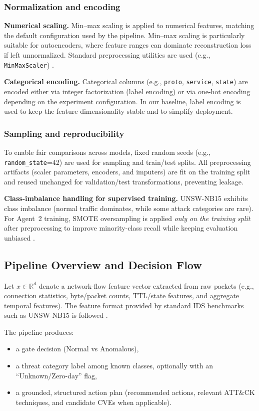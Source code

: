 \documentclass[conference]{IEEEtran}
\begin{document}
\subsubsection{Normalization and encoding}
\textbf{Numerical scaling.} Min--max scaling is applied to numerical features, matching the default configuration used by the pipeline. Min--max scaling is particularly suitable for autoencoders, where feature ranges can dominate reconstruction loss if left unnormalized. Standard preprocessing utilities are used (e.g., \texttt{MinMaxScaler}) \cite{Pedregosa2011Scikit}.

\textbf{Categorical encoding.} Categorical columns (e.g., \texttt{proto}, \texttt{service}, \texttt{state}) are encoded either via integer factorization (label encoding) or via one-hot encoding depending on the experiment configuration. In our baseline, label encoding is used to keep the feature dimensionality stable and to simplify deployment.

\subsubsection{Sampling and reproducibility}
To enable fair comparisons across models, fixed random seeds (e.g., \texttt{random\_state}=42) are used for sampling and train/test splits. All preprocessing artifacts (scaler parameters, encoders, and imputers) are fit on the training split and reused unchanged for validation/test transformations, preventing leakage.

\textbf{Class-imbalance handling for supervised training.} UNSW-NB15 exhibits class imbalance (normal traffic dominates, while some attack categories are rare). For Agent~2 training, SMOTE oversampling is applied \emph{only on the training split} after preprocessing to improve minority-class recall while keeping evaluation unbiased \cite{Chawla2002SMOTE}.

\subsection{Pipeline Overview and Decision Flow}
\label{sec:method_overview}

Let $x \in \mathbb{R}^d$ denote a network-flow feature vector extracted from raw packets (e.g., connection statistics, byte/packet counts, TTL/state features, and aggregate temporal features). The feature format provided by standard IDS benchmarks such as UNSW-NB15 is followed \cite{Moustafa2015UNSW}.

The pipeline produces:
\begin{itemize}
  \item a gate decision (Normal vs Anomalous),
  \item a threat category label among known classes, optionally with an ``Unknown/Zero-day'' flag,
  \item a grounded, structured action plan (recommended actions, relevant ATT\&CK techniques, and candidate CVEs when applicable).
\end{itemize}
\end{document}
